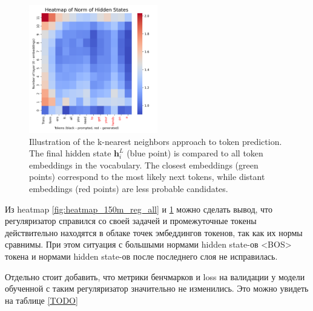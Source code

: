 \begin{figure}[h]
    \centering
    \includegraphics[width=0.5\textwidth]{images/heatmap_150m_reg_notall.png}
    \caption{Illustration of the k-nearest neighbors approach to token prediction. The final hidden state $\mathbf{h}_i^L$ (blue point) is compared to all token embeddings in the vocabulary. The closest embeddings (green points) correspond to the most likely next tokens, while distant embeddings (red points) are less probable candidates.}
    \label{fig:heatmap_150m_reg_notall}
\end{figure}

Из heatmap \ref{fig:heatmap_150m_reg_all} и \ref{fig:heatmap_150m_reg_notall} можно сделать вывод, что регуляризатор справился со своей задачей и промежуточные токены действительно находятся в облаке точек эмбеддингов токенов, так как их нормы сравнимы. При этом ситуация с большыми нормами hidden state-ов <BOS> токена и нормами hidden state-ов после последнего слоя не исправилась. 

Отдельно стоит добавить, что метрики бенчмарков и loss на валидации у модели обученной с таким регуляризатор значительно не изменились. Это можно увидеть на таблице \ref{TODO}